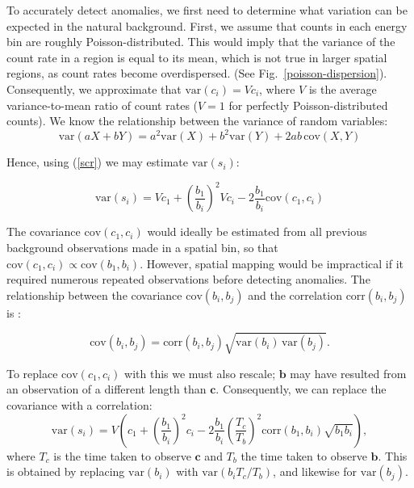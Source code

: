 To accurately detect anomalies, we first need to determine what variation can be
expected in the natural background. First, we assume that counts in each energy
bin are roughly Poisson-distributed. This would imply that the variance of the
count rate in a region is equal to its mean, which is not true in larger spatial
regions, as count rates become overdispersed. (See
Fig.~\ref{poisson-dispersion}). Consequently, we approximate that \(\text{var}
(c_i) = V c_i\), where \(V\) is the average variance-to-mean ratio of count
rates (\(V=1\) for perfectly Poisson-distributed counts). We know the
relationship between the variance of random variables:
\begin{equation}
\text{var}(aX + bY) =
a^2 \text{var}(X)  + b^2 \text{var}(Y) +  2 ab\, \text{cov}(X,Y)
\end{equation}

Hence, using (\ref{scr}) we may estimate \(\text{var}(s_i)\):

\begin{equation}
  \text{var}(s_i) = V c_1 + \left(\frac{b_1}{b_i}\right)^2 V c_i - 2
  \frac{b_1}{b_i} \text{cov}(c_1, c_i)
\end{equation}

The covariance \(\text{cov}(c_1, c_i)\) would ideally be estimated from all
previous background observations made in a spatial bin, so that
\(\text{cov}(c_1, c_i) \propto \text{cov}(b_1, b_i)\). However, spatial mapping
would be impractical if it required numerous repeated observations before
detecting anomalies. The relationship between the covariance \(\text{cov}(b_i,
b_j)\) and the correlation \(\text{corr}(b_i, b_j)\) is \cite{Morrison}:

\begin{equation}
  \text{cov}(b_i, b_j) = \text{corr}(b_i, b_j) \sqrt{\text{var}(b_i) \, \text{var}(b_j)}.
\end{equation}

To replace \(\text{cov}(c_1, c_i)\) with this we must also rescale;
\(\mathbf{b}\) may have resulted from an observation of a different length than
\(\mathbf{c}\). Consequently, we can replace the covariance with a correlation:
\begin{equation}\label{vars}
  \text{var}(s_i) = 
  V\left(c_1 + \left(\frac{b_1}{b_i}\right)^2 c_i - 2 \frac{b_1}{b_i}
  \left(\frac{T_c}{T_b}\right)^2 \text{corr}(b_1, b_i) \sqrt{b_1 b_i}\right),
\end{equation}
where \(T_c\) is the time taken to observe \(\mathbf{c}\) and \(T_b\) the time
taken to observe \(\mathbf{b}\). This is obtained by replacing
\(\text{var}(b_i)\) with \(\text{var}(b_i T_c/T_b)\), and likewise for \(\text{var}(b_j)\).

